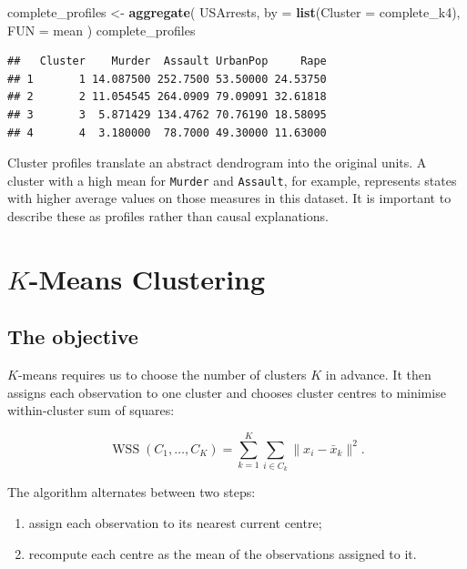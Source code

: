 \documentclass[
  11pt,
]{article}
\newenvironment{Shaded}{\begin{snugshade}}{\end{snugshade}}
\newcommand{\AttributeTok}[1]{\textcolor[rgb]{0.13,0.29,0.53}{#1}}
\newcommand{\FunctionTok}[1]{\textcolor[rgb]{0.13,0.29,0.53}{\textbf{#1}}}
\newcommand{\NormalTok}[1]{#1}
\newcommand{\OtherTok}[1]{\textcolor[rgb]{0.56,0.35,0.01}{#1}}
\providecommand{\tightlist}{%
  \setlength{\itemsep}{0pt}\setlength{\parskip}{0pt}}
\begin{document}
\begin{Shaded}
\begin{Highlighting}[]
\NormalTok{complete\_profiles }\OtherTok{\textless{}{-}} \FunctionTok{aggregate}\NormalTok{(}
\NormalTok{  USArrests,}
  \AttributeTok{by =} \FunctionTok{list}\NormalTok{(}\AttributeTok{Cluster =}\NormalTok{ complete\_k4),}
  \AttributeTok{FUN =}\NormalTok{ mean}
\NormalTok{)}
\NormalTok{complete\_profiles}
\end{Highlighting}
\end{Shaded}

\begin{verbatim}
##   Cluster    Murder  Assault UrbanPop     Rape
## 1       1 14.087500 252.7500 53.50000 24.53750
## 2       2 11.054545 264.0909 79.09091 32.61818
## 3       3  5.871429 134.4762 70.76190 18.58095
## 4       4  3.180000  78.7000 49.30000 11.63000
\end{verbatim}

Cluster profiles translate an abstract dendrogram into the original
units. A cluster with a high mean for \texttt{Murder} and
\texttt{Assault}, for example, represents states with higher average
values on those measures in this dataset. It is important to describe
these as profiles rather than causal explanations.

\section{\texorpdfstring{\(K\)-Means
Clustering}{K-Means Clustering}}\label{k-means-clustering}

\subsection{The objective}\label{the-objective}

\(K\)-means requires us to choose the number of clusters \(K\) in
advance. It then assigns each observation to one cluster and chooses
cluster centres to minimise within-cluster sum of squares:

\[
\operatorname{WSS}(C_1,\ldots,C_K)
= \sum_{k=1}^{K}\sum_{i\in C_k}
\|x_i-\bar x_k\|^2.
\]

The algorithm alternates between two steps:

\begin{enumerate}
\def\labelenumi{\arabic{enumi}.}
\tightlist
\item
  assign each observation to its nearest current centre;
\item
  recompute each centre as the mean of the observations assigned to it.
\end{enumerate}
\end{document}
